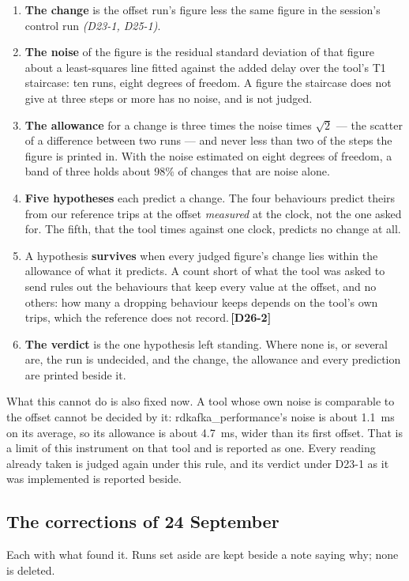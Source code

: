 \documentclass[11pt]{article}
\newcommand{\gl}[1]{{\color{soft}\itshape\small (#1)}}
\newcommand{\chgold}[1]{\,{\color{oldcol}\bfseries\footnotesize[#1]}}
\begin{document}
\begin{enumerate}
  \item \textbf{The change} is the offset run's figure less the same figure in the session's
        control run \gl{D23-1, D25-1}.
  \item \textbf{The noise} of the figure is the residual standard deviation of that figure about
        a least-squares line fitted against the added delay over the tool's T1 staircase: ten
        runs, eight degrees of freedom. A figure the staircase does not give at three steps or
        more has no noise, and is not judged.
  \item \textbf{The allowance} for a change is three times the noise times $\sqrt{2}$ --- the
        scatter of a difference between two runs --- and never less than two of the steps the
        figure is printed in. With the noise estimated on eight degrees of freedom, a band of
        three holds about 98\% of changes that are noise alone.
  \item \textbf{Five hypotheses} each predict a change. The four behaviours predict theirs from
        our reference trips at the offset \emph{measured} at the clock, not the one asked for.
        The fifth, that the tool times against one clock, predicts no change at all.
  \item A hypothesis \textbf{survives} when every judged figure's change lies within the
        allowance of what it predicts. A count short of what the tool was asked to send rules
        out the behaviours that keep every value at the offset, and no others: how many a
        dropping behaviour keeps depends on the tool's own trips, which the reference
        does not record.\chgold{D26-2}
  \item \textbf{The verdict} is the one hypothesis left standing. Where none is, or several are,
        the run is undecided, and the change, the allowance and every prediction are printed
        beside it.
\end{enumerate}

What this cannot do is also fixed now. A tool whose own noise is comparable to the offset cannot
be decided by it: rdkafka\_performance's noise is about 1.1~ms on its average, so its allowance
is about 4.7~ms, wider than its first offset. That is a limit of this instrument on that tool and
is reported as one. Every reading already taken is judged again under this rule, and its verdict
under D23-1 as it was implemented is reported beside.

\subsection*{The corrections of 24 September}
Each with what found it. Runs set aside are kept beside a note saying why; none is deleted.
\end{document}
